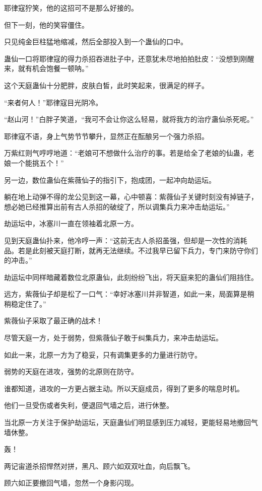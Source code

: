 \begin{this_body}
耶律寇狞笑，他的这招可不是那么好接的。

但下一刻，他的笑容僵住。

只见纯金巨柱猛地缩减，然后全部投入到一个蛊仙的口中。

蛊仙一口将耶律寇的得力杀招吞进肚子中，还意犹未尽地拍拍肚皮：“没想到刚醒来，就有机会饱餐一顿呐。”

这个天庭蛊仙十分肥胖，皮肤白皙，此时笑起来，很满足的样子。

“来者何人！”耶律寇目光阴冷。

“赵山河！”白胖子笑道，“我可不会让你这么轻易，就将我方的治疗蛊仙杀死呢。”

耶律寇不语，身上气势节节攀升，显然正在酝酿另一个强力杀招。

万紫红则气哼哼地道：“老娘可不想做什么治疗的事。若是给全了老娘的仙蛊，老娘一个能挑五个！”

另一边，数位蛊仙在紫薇仙子的指引下，抱成团，一起冲向劫运坛。

躺在地上动弹不得的龙公见到这一幕，心中顿喜：紫薇仙子关键时刻没有掉链子，想必她已经推算出前有古人杀招的破绽了，所以调集兵力来冲击劫运坛。”

劫运坛中，冰塞川一直在领袖着北原一方。

见到天庭蛊仙扑来，他冷哼一声：“这前无古人杀招虽强，但却是一次性的消耗品。若是此刻被天庭打断，就再无法继续。不过我早已留下兵力，专门来防守你们的冲击。”

劫运坛中同样暗藏着数位北原蛊仙，此刻纷纷飞出，将天庭来犯的蛊仙们阻挡住。

远方，紫薇仙子却是松了一口气：“幸好冰塞川并非智道，如此一来，局面算是稍稍稳定住了。”

紫薇仙子采取了最正确的战术！

尽管天庭一方，处于弱势，但紫薇仙子敢于纠集兵力，来冲击劫运坛。

如此一来，北原一方为了稳妥，只有调集更多的力量进行防守。

弱势的天庭在进攻，强势的北原则在防守。

谁都知道，进攻的一方更占据主动。所以天庭成员，得到了更多的喘息时机。

他们一旦受伤或者失利，便退回气墙之后，进行休整。

当北原一方关注于保护劫运坛，天庭蛊仙们明显感到压力减轻，更能轻易地撤回气墙休整。

轰！

两记宙道杀招悍然对拼，黑凡、顾六如双双吐血，向后飘飞。

顾六如正要撤回气墙，忽然一个身影闪现。


\end{this_body}

